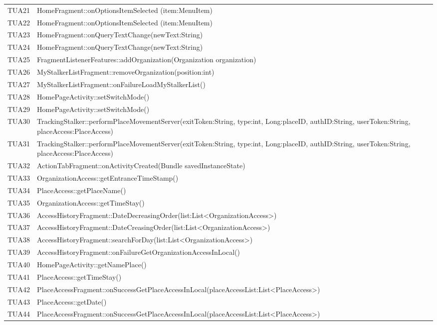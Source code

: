 {\begin{longtable}{C{2cm} C{12cm}}
		TUA21 & HomeFragment::onOptionsItemSelected (item:MenuItem)\\
		TUA22 & HomeFragment::onOptionsItemSelected (item:MenuItem)\\
		TUA23 & HomeFragment::onQueryTextChange(newText:String)\\
		TUA24 & HomeFragment::onQueryTextChange(newText:String)\\
		TUA25 & FragmentListenerFeatures::addOrganization(Organization organization)\\
		TUA26 & MyStalkerListFragment::removeOrganization(position:int)\\
		TUA27 & MyStalkerListFragment::onFailureLoadMyStalkerList()\\
		TUA28 & HomePageActivity::setSwitchMode()\\
		TUA29 & HomePageActivity::setSwitchMode()\\
		TUA30 & TrackingStalker::performPlaceMovementServer(exitToken:String, type:int, Long:placeID, authID:String, userToken:String, placeAccess:PlaceAccess)\\
		TUA31 & TrackingStalker::performPlaceMovementServer(exitToken:String, type:int, Long:placeID, authID:String, userToken:String, placeAccess:PlaceAccess)\\
		TUA32 & ActionTabFragment::onActivityCreated(Bundle savedInstanceState)\\
		TUA33 & OrganizationAccess::getEntranceTimeStamp()\\
		TUA34 & PlaceAccess::getPlaceName()\\
		TUA35 & OrganizationAccess::getTimeStay()\\
		TUA36 & AccessHistoryFragment::DateDecreasingOrder(list:List<OrganizationAccess>)\\
		TUA37 & AccessHistoryFragment::DateCreasingOrder(list:List<OrganizationAccess>)\\
		TUA38 & AccessHistoryFragment::searchForDay(list:List<OrganizationAccess>)\\
		TUA39 & AccessHistoryFragment::onFailureGetOrganizationAccessInLocal()\\
		TUA40 & HomePageActivity::getNamePlace()\\
		TUA41 & PlaceAccess::getTimeStay()\\
		TUA42 & PlaceAccessFragment::onSuccessGetPlaceAccessInLocal(placeAccessList:List<PlaceAccess>)\\
		TUA43 & PlaceAccess::getDate()\\
		TUA44 & PlaceAccessFragment::onSuccessGetPlaceAccessInLocal(placeAccessList:List<PlaceAccess>)\\

\end{longtable}}
